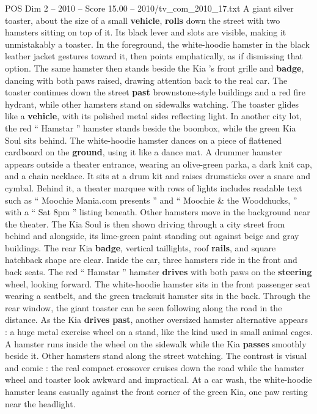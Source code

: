 \begin{textsample}{POS Dim 2 – 2010 – Score 15.00 – 2010/tv\_com\_2010\_17.txt}
A giant silver toaster, about the size of a small \textbf{vehicle}, \textbf{rolls} down the street with two hamsters sitting on top of it.
Its black lever and slots are visible, making it unmistakably a toaster.
In the foreground, the white-hoodie hamster in the black leather jacket gestures toward it, then points emphatically, as if dismissing that option.
The same hamster then stands beside the Kia ’s front grille and \textbf{badge}, dancing with both paws raised, drawing attention back to the real car.
The toaster continues down the street \textbf{past} brownstone-style buildings and a red fire hydrant, while other hamsters stand on sidewalks watching.
The toaster glides like a \textbf{vehicle}, with its polished metal sides reflecting light.
In another city lot, the red “ Hamstar ” hamster stands beside the boombox, while the green Kia Soul sits behind.
The white-hoodie hamster dances on a piece of flattened cardboard on the \textbf{ground}, using it like a dance mat.
A drummer hamster appears outside a theater entrance, wearing an olive-green parka, a dark knit cap, and a chain necklace.
It sits at a drum kit and raises drumsticks over a snare and cymbal.
Behind it, a theater marquee with rows of lights includes readable text such as “ Moochie Mania.com presents ” and “ Moochie \& the Woodchucks, ” with a “ Sat 8pm ” listing beneath.
Other hamsters move in the background near the theater.
The Kia Soul is then shown driving through a city street from behind and alongside, its lime-green paint standing out against beige and gray buildings.
The rear Kia \textbf{badge}, vertical taillights, roof \textbf{rails}, and square hatchback shape are clear.
Inside the car, three hamsters ride in the front and back seats.
The red “ Hamstar ” hamster \textbf{drives} with both paws on the \textbf{steering} wheel, looking forward.
The white-hoodie hamster sits in the front passenger seat wearing a seatbelt, and the green tracksuit hamster sits in the back.
Through the rear window, the giant toaster can be seen following along the road in the distance.
As the Kia \textbf{drives} \textbf{past}, another oversized hamster alternative appears : a huge metal exercise wheel on a stand, like the kind used in small animal cages.
A hamster runs inside the wheel on the sidewalk while the Kia \textbf{passes} smoothly beside it.
Other hamsters stand along the street watching.
The contrast is visual and comic : the real compact crossover cruises down the road while the hamster wheel and toaster look awkward and impractical.
At a car wash, the white-hoodie hamster leans casually against the front corner of the green Kia, one paw resting near the headlight.

\end{textsample}
